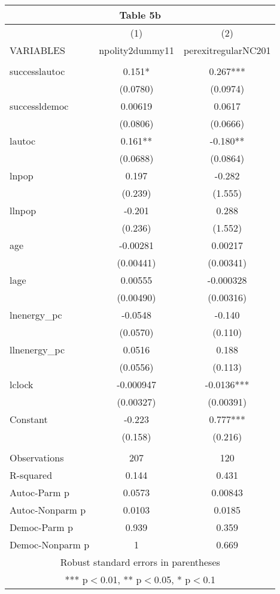 \documentclass[]{article}
\begin{document}
\begin{tabular}{lcc}
\multicolumn{3}{c}{Table 5b} \\ \hline
 & (1) & (2) \\
VARIABLES & npolity2dummy11 & perexitregularNC201 \\ \hline
 &  &  \\
successlautoc & 0.151* & 0.267*** \\
 & (0.0780) & (0.0974) \\
successldemoc & 0.00619 & 0.0617 \\
 & (0.0806) & (0.0666) \\
lautoc & 0.161** & -0.180** \\
 & (0.0688) & (0.0864) \\
lnpop & 0.197 & -0.282 \\
 & (0.239) & (1.555) \\
llnpop & -0.201 & 0.288 \\
 & (0.236) & (1.552) \\
age & -0.00281 & 0.00217 \\
 & (0.00441) & (0.00341) \\
lage & 0.00555 & -0.000328 \\
 & (0.00490) & (0.00316) \\
lnenergy\_pc & -0.0548 & -0.140 \\
 & (0.0570) & (0.110) \\
llnenergy\_pc & 0.0516 & 0.188 \\
 & (0.0556) & (0.113) \\
lclock & -0.000947 & -0.0136*** \\
 & (0.00327) & (0.00391) \\
Constant & -0.223 & 0.777*** \\
 & (0.158) & (0.216) \\
 &  &  \\
Observations & 207 & 120 \\
R-squared & 0.144 & 0.431 \\
Autoc-Parm p & 0.0573 & 0.00843 \\
Autoc-Nonparm p & 0.0103 & 0.0185 \\
Democ-Parm p & 0.939 & 0.359 \\
 Democ-Nonparm p & 1 & 0.669 \\ \hline
\multicolumn{3}{c}{ Robust standard errors in parentheses} \\
\multicolumn{3}{c}{ *** p$<$0.01, ** p$<$0.05, * p$<$0.1} \\
\end{tabular}
\end{document}
